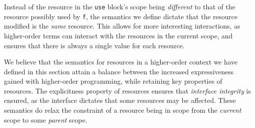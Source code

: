 Instead of the resource in the \texttt{use} block's scope being \textit{different} to that of the resource possibly used by \texttt{f}, the semantics we define dictate that the resource modified is the \textit{same} resource. This allows for more interesting interactions, as higher-order terms can interact with the resources in the current scope, and ensures that there is always a single value for each resource.

We believe that the semantics for resources in a higher-order context we have defined in this section attain a balance between the increased expressiveness gained with higher-order programming, while retaining key properties of resources. The explicitness property of resources ensures that \textit{interface integrity} is ensured, as the interface dictates that some resources may be affected. These semantics do relax the constraint of a resource being in scope from the \textit{current} scope to some \textit{parent} scope.
